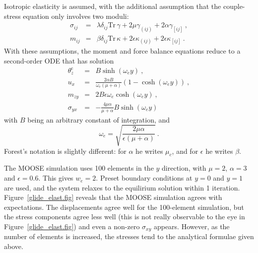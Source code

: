 \documentclass[]{scrreprt}
\newcommand{\si}{\sigma}
\newcommand{\thetac}{\theta^{\mathrm{c}}}
\newcommand{\ep}{\epsilon}
\newcommand{\ga}{\gamma}
\newcommand{\non}{\nonumber}
\newcommand{\de}{\delta}
\newcommand{\ka}{\kappa}
\newcommand{\la}{\lambda}
\newcommand{\tr}{\mbox{Tr}\,}
\newcommand{\al}{\alpha}
\newcommand{\be}{\beta}
\begin{document}
Isotropic elasticity is assumed, with the additional assumption that
the couple-stress equation only involves two moduli:
\begin{eqnarray}
\si_{ij} & = & \la\de_{ij}\tr\ga + 2\mu\ga_{(ij)} + 2\al\ga_{[ij]} \ ,
\non \\
m_{ij} & = & \be\de_{ij}\tr\ka + 2\ep\ka_{(ij)} + 2\ep\ka_{[ij]} \ .
\end{eqnarray}
With these assumptions, the moment and force balance equations reduce
to a second-order ODE that has solution
\begin{eqnarray}
\thetac_{z} & = & B\sinh(\omega_{e}y) \ , \\
u_{x} & = & \frac{2 \al B}{\omega_{e}(\mu + \al)}(1 -
\cosh(\omega_{e}y)) \ , \\
m_{zy} & = & 2B\epsilon \omega_{e}\cosh(\omega_{e}y) \ , \\
\sigma_{yx} & = & -\frac{4\mu\al}{\mu + \al}B\sinh(\omega_{e}y)
\end{eqnarray}
with $B$ being an arbitrary constant of integration, and
\begin{equation}
\omega_{e} = \sqrt{\frac{2\mu\al}{\epsilon(\mu + \al)}} \ .
\end{equation}
Forest's notation is slightly different: for $\al$ he writes $\mu_{c}$,
and for $\epsilon$ he writes $\beta$.

The MOOSE simulation uses 100 elements in the $y$ direction, with
$\mu=2$, $\al=3$ and $\epsilon=0.6$.  This gives $w_{e}=2$.  Preset
boundary conditions at $y=0$ and $y=1$ are used, and the system
relaxes to the equilirium solution within 1 iteration.
Figure~\ref{glide_elast.fig} reveals that the MOOSE simulation agrees
with expectations.  The displacements agree well for the 100-element
simulation, but the stress components agree less well (this is not
really observable to the eye in Figure~\ref{glide_elast.fig}) and even a
non-zero $\sigma_{xy}$ appears.  However, as the number of elements
is increased, the stresses tend to the analytical formulae given above.
\end{document}

